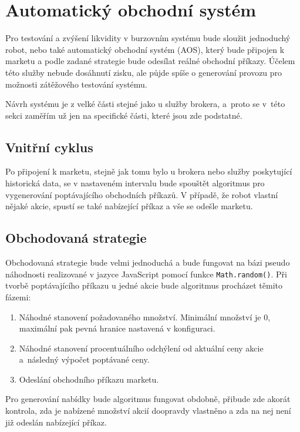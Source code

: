 \documentclass[thesis=M,czech]{FITthesis}[2012/06/26]
\begin{document}
\section{Automatický obchodní systém}
	
	Pro testování a zvýšení likvidity v burzovním systému bude sloužit jednoduchý robot, nebo také automatický obchodní systém (AOS), který bude připojen k marketu a podle zadané strategie bude odesílat reálné obchodní příkazy. Účelem této služby nebude dosáhnutí zisku, ale půjde spíše o generování provozu pro možnosti zátěžového testování systému.
	
	Návrh systému je z velké části stejné jako u služby brokera, a~proto se v~této sekci zaměřím už jen na specifické části, které jsou zde podstatné.

\subsection{Vnitřní cyklus}
	
	Po připojení k marketu, stejně jak tomu bylo u brokera nebo služby poskytující historická data, se v nastaveném intervalu bude spouštět algoritmus pro vygenerování poptávajícího obchodních příkazů. V případě, že robot vlastní nějaké akcie, spustí se také nabízející příkaz a vše se odešle marketu.
	
\subsection{Obchodovaná strategie}

	Obchodovaná strategie bude velmi jednoduchá a bude fungovat na bázi pseudo náhodnosti realizované v jazyce JavaScript pomocí funkce \texttt{Math.random()}. Při tvorbě poptávajícího příkazu u jedné akcie bude algoritmus procházet těmito fázemi:

\begin{enumerate}
  \item Náhodné stanovení požadovaného množství. Minimální množství je 0, maximální pak pevná hranice nastavená v konfiguraci.

  \item Náhodné stanovení procentuálního odchýlení od aktuální ceny akcie a~následný výpočet poptávané ceny.
  
  \item Odeslání obchodního příkazu marketu.
\end{enumerate}
	
	Pro generování nabídky bude algoritmus fungovat obdobně, přibude zde akorát kontrola, zda je nabízené množství akcií doopravdy vlastněno a zda na nej není již odeslán nabízející příkaz.
\end{document}
